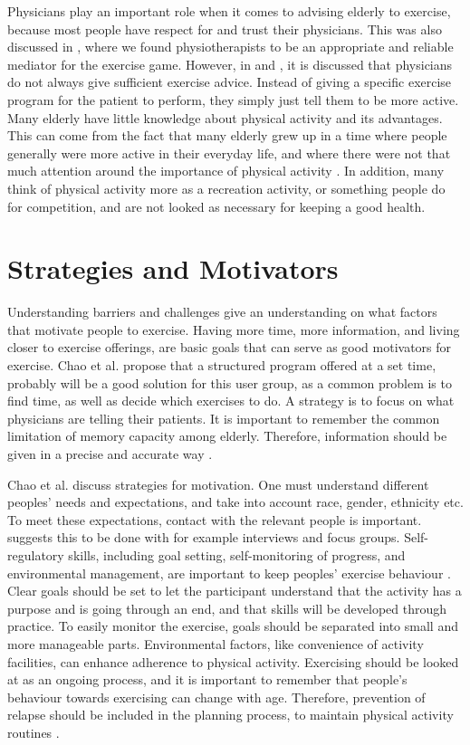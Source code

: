 Physicians play an important role when it comes to advising elderly to exercise, because most people have respect for and trust their physicians. This was also discussed in \cite{project}, where we found physiotherapists to be an appropriate and reliable mediator for the exercise game. However, in \cite{schutzer} and \cite{chao}, it is discussed that physicians do not always give sufficient exercise advice. Instead of giving a specific exercise program for the patient to perform, they simply just tell them to be more active. Many elderly have little knowledge about physical activity and its advantages. This can come from the fact that many elderly grew up in a time where people generally were more active in their everyday life, and where there were not that much attention around the importance of physical activity \cite{schutzer}. In addition, many think of physical activity more as a recreation activity, or something people do for competition, and are not looked as necessary for keeping a good health.  

\section{Strategies and Motivators}
\label{sec:motivators}
Understanding barriers and challenges give an understanding on what factors that motivate people to exercise. Having more time, more information, and living closer to exercise offerings, are basic goals that can serve as good motivators for exercise. Chao et al. \cite{chao} propose that a structured program offered at a set time, probably will be a good solution for this user group, as a common problem is to find time, as well as decide which exercises to do. A strategy is to focus on what physicians are telling their patients. It is important to remember the common limitation of memory capacity among elderly. Therefore, information should be given in a precise and accurate way \cite{chao}.  

Chao et al. \cite{chao} discuss strategies for motivation. One must understand different peoples' needs and expectations, and take into account race, gender, ethnicity etc. To meet these expectations, contact with the relevant people is important. \cite{chao} suggests this to be done with for example interviews and focus groups. Self-regulatory skills, including goal setting, self-monitoring of progress, and environmental management, are important to keep peoples' exercise behaviour \cite{chao}. Clear goals should be set to let the participant understand that the activity has a purpose and is going through an end, and that skills will be developed through practice. To easily monitor the exercise, goals should be separated into small and more manageable parts. Environmental factors, like convenience of activity facilities, can enhance adherence to physical activity. Exercising should be looked at as an ongoing process, and it is important to remember that people's behaviour towards exercising can change with age. Therefore, prevention of relapse should be included in the planning process, to maintain physical activity routines \cite{chao}. 

